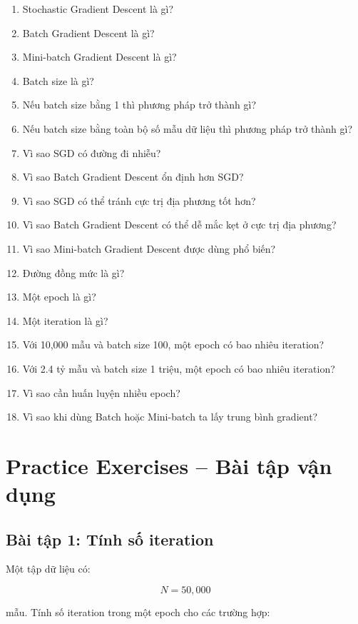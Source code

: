 \begin{enumerate}
    \item Stochastic Gradient Descent là gì?
    \item Batch Gradient Descent là gì?
    \item Mini-batch Gradient Descent là gì?
    \item Batch size là gì?
    \item Nếu batch size bằng 1 thì phương pháp trở thành gì?
    \item Nếu batch size bằng toàn bộ số mẫu dữ liệu thì phương pháp trở thành gì?
    \item Vì sao SGD có đường đi nhiễu?
    \item Vì sao Batch Gradient Descent ổn định hơn SGD?
    \item Vì sao SGD có thể tránh cực trị địa phương tốt hơn?
    \item Vì sao Batch Gradient Descent có thể dễ mắc kẹt ở cực trị địa phương?
    \item Vì sao Mini-batch Gradient Descent được dùng phổ biến?
    \item Đường đồng mức là gì?
    \item Một epoch là gì?
    \item Một iteration là gì?
    \item Với 10,000 mẫu và batch size 100, một epoch có bao nhiêu iteration?
    \item Với 2.4 tỷ mẫu và batch size 1 triệu, một epoch có bao nhiêu iteration?
    \item Vì sao cần huấn luyện nhiều epoch?
    \item Vì sao khi dùng Batch hoặc Mini-batch ta lấy trung bình gradient?
\end{enumerate}

\section{Practice Exercises -- Bài tập vận dụng}

\subsection*{Bài tập 1: Tính số iteration}

Một tập dữ liệu có:

\[
    N=50,000
\]

mẫu. Tính số iteration trong một epoch cho các trường hợp:

